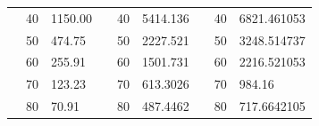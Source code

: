 \begin{table}[h]
\begin{tabular}{|cclcclccl|}
\rowcolor[HTML]{DDFDFF} 
\multicolumn{1}{|c|}{\cellcolor[HTML]{FFFFC7}}                                & \multicolumn{1}{c|}{\cellcolor[HTML]{DDFDFF}40}        & \multicolumn{1}{l|}{\cellcolor[HTML]{DDFDFF}1150.00}    & \multicolumn{1}{c|}{\cellcolor[HTML]{FFFFC7}}                                & \multicolumn{1}{c|}{\cellcolor[HTML]{DDFDFF}40}        & \multicolumn{1}{l|}{\cellcolor[HTML]{DDFDFF}5414.136}   & \multicolumn{1}{c|}{\cellcolor[HTML]{FFFFC7}}                                & \multicolumn{1}{c|}{\cellcolor[HTML]{DDFDFF}40}        & 6821.461053 \\ \cline{2-3} \cline{5-6} \cline{8-9} 
\rowcolor[HTML]{DAE8FC} 
\multicolumn{1}{|c|}{\cellcolor[HTML]{FFFFC7}}                                & \multicolumn{1}{c|}{\cellcolor[HTML]{DAE8FC}50}        & \multicolumn{1}{l|}{\cellcolor[HTML]{DAE8FC}474.75}     & \multicolumn{1}{c|}{\cellcolor[HTML]{FFFFC7}}                                & \multicolumn{1}{c|}{\cellcolor[HTML]{DAE8FC}50}        & \multicolumn{1}{l|}{\cellcolor[HTML]{DAE8FC}2227.521}   & \multicolumn{1}{c|}{\cellcolor[HTML]{FFFFC7}}                                & \multicolumn{1}{c|}{\cellcolor[HTML]{DAE8FC}50}        & 3248.514737 \\ \cline{2-3} \cline{5-6} \cline{8-9} 
\rowcolor[HTML]{DDFDFF} 
\multicolumn{1}{|c|}{\cellcolor[HTML]{FFFFC7}}                                & \multicolumn{1}{c|}{\cellcolor[HTML]{DDFDFF}60}        & \multicolumn{1}{l|}{\cellcolor[HTML]{DDFDFF}255.91}     & \multicolumn{1}{c|}{\cellcolor[HTML]{FFFFC7}}                                & \multicolumn{1}{c|}{\cellcolor[HTML]{DDFDFF}60}        & \multicolumn{1}{l|}{\cellcolor[HTML]{DDFDFF}1501.731}   & \multicolumn{1}{c|}{\cellcolor[HTML]{FFFFC7}}                                & \multicolumn{1}{c|}{\cellcolor[HTML]{DDFDFF}60}        & 2216.521053 \\ \cline{2-3} \cline{5-6} \cline{8-9} 
\rowcolor[HTML]{DAE8FC} 
\multicolumn{1}{|c|}{\cellcolor[HTML]{FFFFC7}}                                & \multicolumn{1}{c|}{\cellcolor[HTML]{DAE8FC}70}        & \multicolumn{1}{l|}{\cellcolor[HTML]{DAE8FC}123.23}     & \multicolumn{1}{c|}{\cellcolor[HTML]{FFFFC7}}                                & \multicolumn{1}{c|}{\cellcolor[HTML]{DAE8FC}70}        & \multicolumn{1}{l|}{\cellcolor[HTML]{DAE8FC}613.3026}   & \multicolumn{1}{c|}{\cellcolor[HTML]{FFFFC7}}                                & \multicolumn{1}{c|}{\cellcolor[HTML]{DAE8FC}70}        & 984.16      \\ \cline{2-3} \cline{5-6} \cline{8-9} 
\rowcolor[HTML]{DDFDFF} 
\multicolumn{1}{|c|}{\cellcolor[HTML]{FFFFC7}}                                & \multicolumn{1}{c|}{\cellcolor[HTML]{DDFDFF}80}        & \multicolumn{1}{l|}{\cellcolor[HTML]{DDFDFF}70.91}      & \multicolumn{1}{c|}{\cellcolor[HTML]{FFFFC7}}                                & \multicolumn{1}{c|}{\cellcolor[HTML]{DDFDFF}80}        & \multicolumn{1}{l|}{\cellcolor[HTML]{DDFDFF}487.4462}   & \multicolumn{1}{c|}{\cellcolor[HTML]{FFFFC7}}                                & \multicolumn{1}{c|}{\cellcolor[HTML]{DDFDFF}80}        & 717.6642105 \\ \cline{2-3} \cline{5-6} \cline{8-9} 

\end{tabular}
\end{table}
